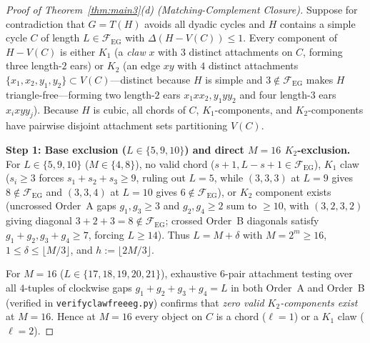 \documentclass[11pt,reqno]{amsart}
\theoremstyle{plain}
\theoremstyle{definition}
\theoremstyle{remark}
\newcommand{\FEG}{\mathcal{F}_{\mathrm{EG}}}
\DeclareRobustCommand{\_}{\ifmmode\text{\textunderscore}\else\textunderscore\allowbreak\fi}
\begin{document}
\begin{proof}[Proof of Theorem~\ref{thm:main3}(d) (Matching-Complement Closure)]
Suppose for contradiction that $G = T(H)$ avoids all dyadic cycles and $H$ contains a simple cycle $C$ of length $L \in \FEG$ with $\Delta(H - V(C)) \le 1$. Every component of $H - V(C)$ is either $K_1$ (a \emph{claw} $x$ with $3$ distinct attachments on $C$, forming three length-$2$ ears) or $K_2$ (an edge $xy$ with $4$ distinct attachments $\{x_1, x_2, y_1, y_2\} \subset V(C)$---distinct because $H$ is simple and $3 \notin \FEG$ makes $H$ triangle-free---forming two length-$2$ ears $x_1 x x_2, y_1 y y_2$ and four length-$3$ ears $x_i x y y_j$). Because $H$ is cubic, all chords of $C$, $K_1$-components, and $K_2$-components have pairwise disjoint attachment sets partitioning $V(C)$.

\medskip
\noindent\textbf{Step 1: Base exclusion ($L \in \{5, 9, 10\}$) and direct $M = 16$ $K_2$-exclusion.}
For $L \in \{5, 9, 10\}$ ($M \in \{4, 8\}$), no valid chord ($s + 1, L - s + 1 \in \FEG$), $K_1$ claw ($s_i \ge 3$ forces $s_1 + s_2 + s_3 \ge 9$, ruling out $L = 5$, while $(3, 3, 3)$ at $L = 9$ gives $8 \notin \FEG$ and $(3, 3, 4)$ at $L = 10$ gives $6 \notin \FEG$), or $K_2$ component exists (uncrossed Order~A gaps $g_1, g_3 \ge 3$ and $g_2, g_4 \ge 2$ sum to $\ge 10$, with $(3,2,3,2)$ giving diagonal $3+2+3 = 8 \notin \FEG$; crossed Order~B diagonals satisfy $g_1 + g_2, g_3 + g_4 \ge 7$, forcing $L \ge 14$). Thus $L = M + \delta$ with $M = 2^m \ge 16$, $1 \le \delta \le \lfloor M/3 \rfloor$, and $h := \lfloor 2M/3 \rfloor$.

For $M = 16$ ($L \in \{17, 18, 19, 20, 21\}$), exhaustive $6$-pair attachment testing over all $4$-tuples of clockwise gaps $g_1 + g_2 + g_3 + g_4 = L$ in both Order~A and Order~B (verified in \texttt{verify\_clawfree\_eg.py}) confirms that \emph{zero valid $K_2$-components exist} at $M = 16$. Hence at $M = 16$ every object on $C$ is a chord ($\ell = 1$) or a $K_1$ claw ($\ell = 2$).


\end{proof}
\end{document}
